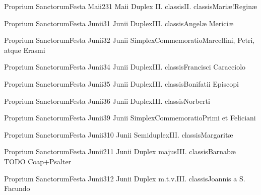 \documentclass[psalterium-feriale.tex]{subfiles}
\begin{document}
	{Proprium Sanctorum}{Festa Maii}{2}{31 Maii}
	{Duplex II. classis}{II. classis}{Mariæ!Reginæ}
	{}
	{}
\psalmodiapropria

	{Proprium Sanctorum}{Festa Junii}{3}{1 Junii}
	{Duplex}{III. classis}{Angelæ Mericiæ}
	{}
	{}

	{Proprium Sanctorum}{Festa Junii}{3}{2 Junii}
	{Simplex}{Commemoratio}{Marcellini, Petri, atque Erasmi\linebreak\null}
	{}
	{}

	{Proprium Sanctorum}{Festa Junii}{3}{4 Junii}
	{Duplex}{III. classis}{Francisci Caracciolo}
	{}
	{}

	{Proprium Sanctorum}{Festa Junii}{3}{5 Junii}
	{Duplex}{III. classis}{Bonifatii Episcopi}
	{}
	{}

	{Proprium Sanctorum}{Festa Junii}{3}{6 Junii}
	{Duplex}{III. classis}{Norberti}
	{}
	{}

	{Proprium Sanctorum}{Festa Junii}{3}{9 Junii}
	{Simplex}{Commemoratio}{Primi et Feliciani}
	{}
	{}

	{Proprium Sanctorum}{Festa Junii}{3}{10 Junii}
	{Semiduplex}{III. classis}{Margaritæ}
	{}
	{}

	{Proprium Sanctorum}{Festa Junii}{2}{11 Junii}
	{Duplex majus}{III. classis}{Barnabæ}
	{\psalmodiapropria}
	{TODO Coap+Psalter}

	{Proprium Sanctorum}{Festa Junii}{3}{12 Junii}
	{Duplex m.t.v.}{III. classis}{Joannis a S. Facundo}
	{}
	{}
\end{document}
